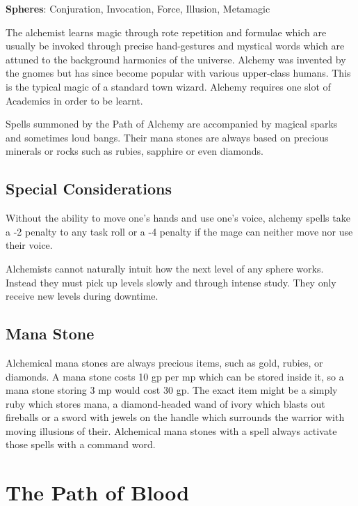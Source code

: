 \textbf{Spheres}: Conjuration, Invocation, Force, Illusion, Metamagic

\begin{multicols}{2}

\noindent The alchemist learns magic through rote repetition and formulae which are usually be invoked through precise hand-gestures and mystical words which are attuned to the background harmonics of the universe.  Alchemy was invented by the gnomes but has since become popular with various upper-class humans. This is the typical magic of a standard town wizard. Alchemy requires one slot of Academics in order to be learnt.

Spells summoned by the Path of Alchemy are accompanied by magical sparks and sometimes loud bangs. Their mana stones are always based on precious minerals or rocks such as rubies, sapphire or even diamonds. 

\subsection{Special Considerations}

Without the ability to move one's hands and use one's voice, alchemy spells take a -2 penalty to any task roll or a -4 penalty if the mage can neither move nor use their voice.

Alchemists cannot naturally intuit how the next level of any sphere works.
Instead they must pick up levels slowly and through intense study.
They only receive new levels during \gls{downtime}.

\subsection{Mana Stone}

Alchemical mana stones are always precious items, such as gold, rubies, or diamonds.  A mana stone costs 10 gp per \gls{mp} which can be stored inside it, so a mana stone storing 3 \gls{mp} would cost 30 gp. The exact item might be a simply ruby which stores mana, a diamond-headed wand of ivory which blasts out fireballs or a sword with jewels on the handle which surrounds the warrior with moving illusions of their. Alchemical mana stones with a spell always activate those spells with a command word.

\end{multicols}

\section{The Path of Blood}

